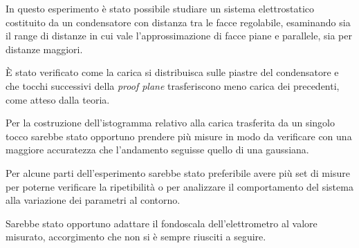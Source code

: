 {\fontsize{12}{14}\selectfont 

In questo esperimento è stato possibile studiare un sistema elettrostatico costituito da un condensatore con distanza tra le facce regolabile, esaminando sia il range di distanze in cui vale l'approssimazione di facce piane e parallele, sia per distanze maggiori. 
\par
È stato verificato come la carica si distribuisca sulle piastre del condensatore e che tocchi successivi della \emph{proof plane} trasferiscono meno carica dei precedenti, come atteso dalla teoria.
\par
Per la costruzione dell'istogramma relativo alla carica trasferita da un singolo tocco sarebbe stato opportuno prendere più misure in modo da verificare con una maggiore accuratezza che l'andamento seguisse quello di una gaussiana.
\par
Per alcune parti dell'esperimento sarebbe stato preferibile avere più set di misure per poterne verificare la ripetibilità o per analizzare il comportamento del sistema alla variazione dei parametri al contorno.
\par

Sarebbe stato opportuno adattare il fondoscala dell'elettrometro al valore misurato, accorgimento che non si è sempre riusciti a seguire.
\par}

